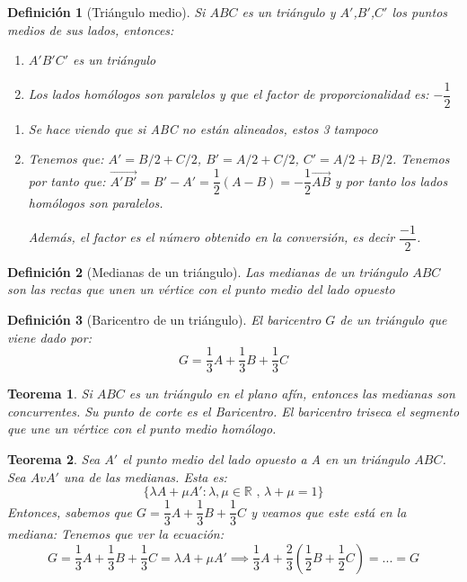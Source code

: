 \documentclass[11pt, a4paper, titlepage]{article}
\makeatletter
\renewenvironment{proof}[1][\proofname] {\vspace{-15pt}\par\pushQED{\qed}\normalfont\topsep6\p@\@plus6\p@\relax\trivlist\item[\hskip\labelsep\it#1\@addpunct{.}]\ignorespaces}{\popQED\endtrivlist\@endpefalse}
\newcommand{\R}{\mathbb{R}}
\theoremstyle{theorem-style}
\newtheorem*{nth}{Teorema}
\theoremstyle{definition-style}
\newtheorem*{ndef}{Definición}
\theoremstyle{remark-style}
\theoremstyle{example-style}
\newenvironment{nlist}
{\begin{enumerate}
\renewcommand\labelenumi{(\emph{\roman{enumi})}}}
{\end{enumerate}}
\makeatother
\begin{document}
\begin{ndef}[Triángulo medio]
	Si $ABC$ es un triángulo y $A'$,$B'$,$C'$ los puntos medios de sus lados, entonces:
	\begin{nlist}
	\item $A'B'C'$ es un triángulo
	\item Los lados homólogos son paralelos y que el factor de proporcionalidad es: $-\dfrac{1}{2}$
\end{nlist}\vspace{0.2cm}
\begin{proof}

	\begin{nlist}
	\item Se hace viendo que si ABC no están alineados, estos 3 tampoco
	\item Tenemos que: $A' = B/2 + C/2$, $B' = A/2+C/2$, $C' = A/2 + B/2$. Tenemos por tanto que: $\vec{A'B'} = B'-A' = \dfrac{1}{2}(A-B) = -\dfrac{1}{2} \vec{AB}$ y por tanto los lados homólogos son paralelos.

Además, el factor es el número obtenido en la conversión, es decir $\dfrac{-1}{2}$.
\end{nlist}
\end{proof}
\end{ndef}

\begin{ndef}[Medianas de un triángulo]
Las medianas de un triángulo $ABC$ son las rectas que unen un vértice con el punto medio del lado opuesto
\end{ndef}
\begin{ndef}[Baricentro de un triángulo]
	El baricentro $G$ de un triángulo que viene dado por:
	\[
	G = \dfrac{1}{3} A +  \dfrac{1}{3} B +  \dfrac{1}{3} C
	\]
\end{ndef}

\begin{nth}
	Si $ABC$ es un triángulo en el plano afín, entonces las medianas son concurrentes. Su punto de corte es el Baricentro. El baricentro triseca el segmento que une un vértice con el punto medio homólogo.


\end{nth}
	\begin{nth}
	Sea $A'$ el punto medio del lado opuesto a A en un triángulo $ABC$. Sea $AvA'$ una de las medianas. Esta es:
	\[
	\{\lambda A + \mu A': \lambda, \mu \in \R \text{ , } \lambda+\mu = 1\}
	\]
	Entonces, sabemos que $G = \dfrac{1}{3} A +  \dfrac{1}{3} B +  \dfrac{1}{3} C$ y veamos que este está en la mediana: Tenemos que ver la ecuación:
	\[
	G = \dfrac{1}{3} A +  \dfrac{1}{3} B +  \dfrac{1}{3} C = \lambda A + \mu A'  \implies \dfrac{1}{3}A + \dfrac{2}{3}(\dfrac{1}{2}B+\dfrac{1}{2}C) = ... = G
	\]

\end{nth}
\end{document}
